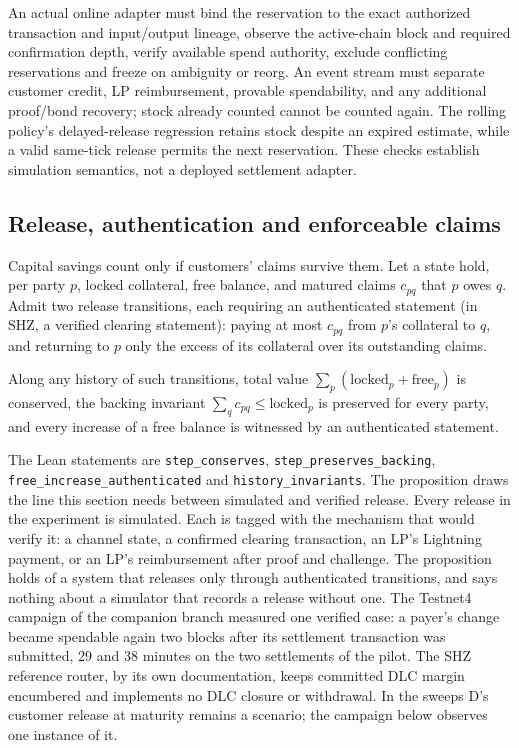 An actual online adapter must bind the reservation to the exact authorized transaction and input/output lineage, observe the active-chain block and required confirmation depth, verify available spend authority, exclude conflicting reservations and freeze on ambiguity or reorg. An event stream must separate customer credit, LP reimbursement, provable spendability, and any additional proof/bond recovery; stock already counted cannot be counted again. The rolling policy's delayed-release regression retains stock despite an expired estimate, while a valid same-tick release permits the next reservation. These checks establish simulation semantics, not a deployed settlement adapter.

\subsection{Release, authentication and enforceable claims}
\label{sec:rent-release}

Capital savings count only if customers' claims survive them. Let a state hold, per party $p$, locked collateral, free balance, and matured claims $c_{pq}$ that $p$ owes $q$. Admit two release transitions, each requiring an authenticated statement (in SHZ, a verified clearing statement): paying at most $c_{pq}$ from $p$'s collateral to $q$, and returning to $p$ only the excess of its collateral over its outstanding claims.

\begin{proposition}
\label{prop:release}
Along any history of such transitions, total value $\sum_p(\text{locked}_p+\text{free}_p)$ is conserved, the backing invariant $\sum_q c_{pq}\le\text{locked}_p$ is preserved for every party, and every increase of a free balance is witnessed by an authenticated statement.
\end{proposition}

The Lean statements are \texttt{step\_\allowbreak{}conserves}, \texttt{step\_\allowbreak{}preserves\_\allowbreak{}backing}, \texttt{free\_\allowbreak{}increase\_\allowbreak{}authenticated} and \texttt{history\_\allowbreak{}invariants}. The proposition draws the line this section needs between simulated and verified release. Every release in the experiment is simulated. Each is tagged with the mechanism that would verify it: a channel state, a confirmed clearing transaction, an LP's Lightning payment, or an LP's reimbursement after proof and challenge. The proposition holds of a system that releases only through authenticated transitions, and says nothing about a simulator that records a release without one. The Testnet4 campaign of the companion branch measured one verified case: a payer's change became spendable again two blocks after its settlement transaction was submitted, 29 and 38 minutes on the two settlements of the pilot. The SHZ reference router, by its own documentation, keeps committed DLC margin encumbered and implements no DLC closure or withdrawal. In the sweeps D's customer release at maturity remains a scenario; the campaign below observes one instance of it.

